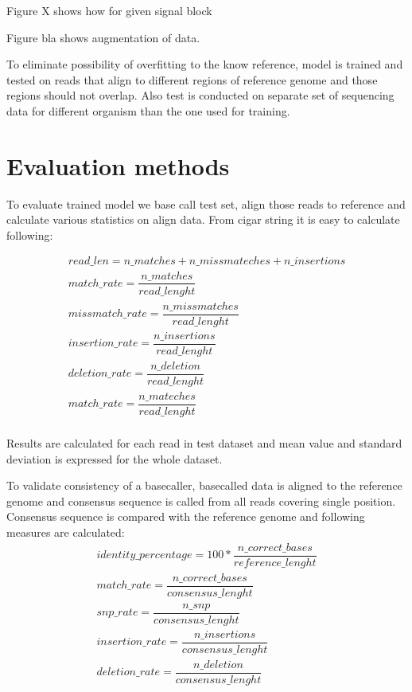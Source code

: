 \documentclass[times, utf8, diplomski, english]{fer}
\begin{document}
Figure X shows how for given signal block


Figure bla shows augmentation of data.

To eliminate possibility of overfitting to the know reference, model is trained and tested on reads that align to different regions of reference genome and those regions should not overlap. Also test is conducted on separate set of sequencing data for different organism than the one used for training. 

\section{Evaluation methods}
To evaluate trained model we base call test set, align those reads to reference and calculate various statistics on align data.
From cigar string it is easy to calculate following:

\begin{gather*}
read\_len =  n\_matches + n\_missmateches + n\_insertions \\
match\_rate = \dfrac{n\_matches}{read\_lenght} \\
missmatch\_rate = \dfrac{n\_missmatches}{read\_lenght}\\
insertion\_rate = \dfrac{n\_insertions}{read\_lenght}\\
deletion\_rate = \dfrac{n\_deletion}{read\_lenght}\\
match\_rate = \dfrac{n\_mateches}{read\_lenght}\\
\end{gather*}

Results are calculated for each read in test dataset and mean value and standard deviation is expressed for the whole dataset.

To validate consistency of a basecaller, basecalled data is aligned to the reference genome and consensus sequence is called from all reads covering single position. Consensus sequence is compared with the reference genome and following measures are calculated:
\begin{gather*}
identity\_percentage =  100 * \dfrac{n\_correct\_bases}{reference\_lenght} \\
match\_rate = \dfrac{n\_correct\_bases}{consensus\_lenght} \\
snp\_rate = \dfrac{n\_snp}{consensus\_lenght}\\
insertion\_rate = \dfrac{n\_insertions}{consensus\_lenght}\\
deletion\_rate = \dfrac{n\_deletion}{consensus\_lenght}\\
\end{gather*}
\end{document}

